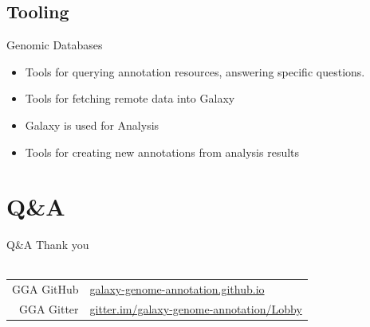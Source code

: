 \documentclass[12pt]{phage3slides} %
\begin{document}
\subsection{Tooling}
\begin{frame}{Genomic Databases}
    \begin{itemize}
        \item Tools for querying annotation resources, answering specific questions. %
        \item Tools for fetching remote data into Galaxy
        \item Galaxy is used for Analysis
        \item Tools for creating new annotations from analysis results
    \end{itemize}
\end{frame}





\section{Q\&A}
\begin{frame}{Q\&A}
    Thank you \\\ \\
    \begin{center}
        \begin{tabular}{rl}
            \color{gray} GGA GitHub & \href{https://galaxy-genome-annotation.github.io/}{galaxy-genome-annotation.github.io}\\
            \color{gray} GGA Gitter & \href{https://gitter.im/galaxy-genome-annotation/Lobby}{gitter.im/galaxy-genome-annotation/Lobby}\\
            \end{tabular}\\[1cm]
            \fundingNSFABIannotation
    \end{center}
\end{frame}
\end{document}
